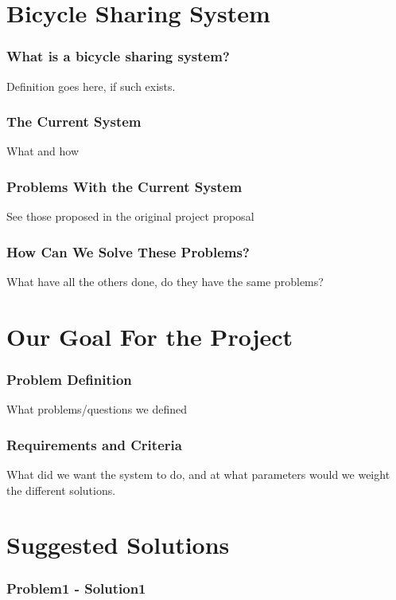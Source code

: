 \section{Bicycle Sharing System}

\begin{frame}
\frametitle{What is a bicycle sharing system?}
	Definition goes here, if such exists.
\end{frame}

\begin{frame}
\frametitle{The Current System}
	What and how
\end{frame}

\begin{frame}
\frametitle{Problems With the Current System}
	See those proposed in the original project proposal
\end{frame}

\begin{frame}
\frametitle{How Can We Solve These Problems?}
	What have all the others done, do they have the same problems?
\end{frame}

\section{Our Goal For the Project}
\begin{frame}
\frametitle{Problem Definition}
	What problems/questions we defined
\end{frame}

\begin{frame}
\frametitle{Requirements and Criteria}
	What did we want the system to do, and at what parameters would we weight the different solutions.
\end{frame}


\section{Suggested Solutions}
\begin{frame}
\frametitle{Problem1 - Solution1}
\end{frame}

